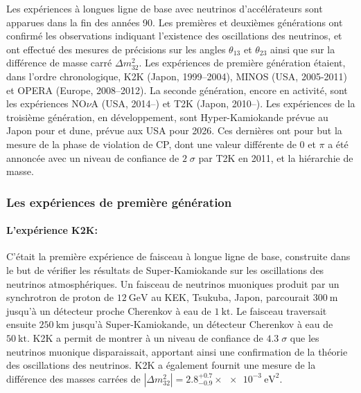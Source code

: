             Les expériences à longues ligne de base avec neutrinos d'accélérateurs sont apparues dans la fin des années 90. Les premières et deuxièmes générations ont confirmé les observations indiquant l'existence des oscillations des neutrinos, et ont effectué des mesures de précisions sur les angles $\theta_{13}$ et $\theta_{23}$ ainsi que sur la différence de masse carré $\Delta m^2_{32}$\cite{pdg2018}. Les expériences de première génération étaient, dans l'ordre chronologique, K2K\cite{Collaboration2006a} (Japon, 1999--2004), MINOS\cite{Collaboration2014} (USA, 2005-2011) et OPERA\cite{Agafonova2018} (Europe, 2008--2012). La seconde génération, encore en activité, sont les expériences NO$\nu$A\cite{Adamson2016} (USA, 2014--) et T2K\cite{Abe2018} (Japon, 2010--). Les expériences de la troisième génération, en développement, sont Hyper-Kamiokande\cite{HK2018} prévue au Japon pour  
            et \gls{dune}\cite{Acciarri2016}, prévue aux USA pour 2026. Ces dernières ont pour but la mesure de la phase de violation de CP, dont une valeur différente de $0$ et $\pi$ a été annoncée avec un niveau de confiance de $2\;\sigma$\cite{t2k-cp} par T2K en 2011, et la hiérarchie de masse.
            
            \subsubsection{Les expériences de première génération}
            
            \paragraph{L'expérience K2K\cite{Collaboration2006a}:} C'était la première expérience de faisceau à longue ligne de base, construite dans le but de vérifier les résultats de Super-Kamiokande sur les oscillations des neutrinos atmosphériques. Un faisceau de neutrinos muoniques produit par un synchrotron de proton de $\SI{12}{\giga\electronvolt}$ au KEK, Tsukuba, Japon, parcourait $\SI{300}{\meter}$ jusqu'à un détecteur proche Cherenkov à eau de $\SI{1}{\kilo\tonne}$. Le faisceau traversait ensuite $\SI{250}{\kilo\meter}$ jusqu'à Super-Kamiokande, un détecteur Cherenkov à eau de $\SI{50}{\kilo\tonne}$. K2K a permit de montrer à un niveau de confiance de $4.3\;\sigma$ que les neutrinos muonique disparaissait, apportant ainsi une confirmation de la théorie des oscillations des neutrinos. K2K a également fournit une mesure de la différence des masses carrées de $|\Delta m^2_{32}|=2.8^{+0.7}_{-0.9}\times\SI{e-3}{\electronvolt\squared}$.
            

